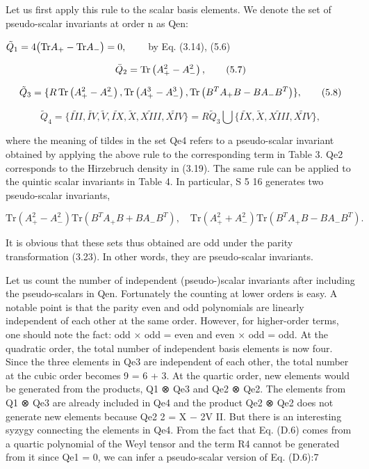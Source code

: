 \documentclass{article}
\begin{document}
Let us first apply this rule to the scalar basis elements. We denote the set of pseudo-scalar invariants at order n as Qen:

$\tilde{Q}_{1}=4\big{(}{\rm Tr}A_{+}-{\rm Tr}A_{-}\big{)}=0,\qquad$ by Eq. (3.14), (5.6)

$$\bar{Q}_{2}={\rm Tr}\left(A_{+}^{2}-A_{-}^{2}\right),\tag{5.7}$$

$$\tilde{Q}_{3}=\{R\,{\rm Tr}\left(A_{+}^{2}-A_{-}^{2}\right),{\rm Tr}\left(A_{+}^{3}-A_{-}^{3}\right),{\rm Tr}\left(B^{T}A_{+}B-BA_{-}B^{T}\right)\},\tag{5.8}$$

$$\widetilde{Q}_{4}=\{\widetilde{III},\widetilde{IV},\widetilde{V},\widetilde{IX},\widetilde{X},\widetilde{XIII},\widetilde{XIV}\}=R\widetilde{Q}_{3}\bigcup\{\widetilde{IX},\widetilde{X},\widetilde{XIII},\widetilde{XIV}\},\tag{5.9}$$

where the meaning of tildes in the set Qe4 refers to a pseudo-scalar invariant obtained by applying the above rule to the corresponding term in Table 3. Qe2 corresponds to the Hirzebruch density in (3.19). The same rule can be applied to the quintic scalar invariants in Table 4. In particular, S 5 16 generates two pseudo-scalar invariants,

$$\mathrm{Tr}\left(A_{+}^{2}-A_{-}^{2}\right)\mathrm{Tr}\left(B^{T}A_{+}B+B A_{-}B^{T}\right),\quad\mathrm{Tr}\left(A_{+}^{2}+A_{-}^{2}\right)\mathrm{Tr}\left(B^{T}A_{+}B-B A_{-}B^{T}\right).$$

It is obvious that these sets thus obtained are odd under the parity transformation (3.23). In other words, they are pseudo-scalar invariants.

Let us count the number of independent (pseudo-)scalar invariants after including the pseudo-scalars in Qen. Fortunately the counting at lower orders is easy. A notable point is that the parity even and odd polynomials are linearly independent of each other at the same order. However, for higher-order terms, one should note the fact: odd × odd = even and even × odd = odd. At the quadratic order, the total number of independent basis elements is now four. Since the three elements in Qe3 are independent of each other, the total number at the cubic order becomes 9 = 6 + 3. At the quartic order, new elements would be generated from the products, Q1 ⊗ Qe3 and Qe2 ⊗ Qe2. The elements from Q1 ⊗ Qe3 are already included in Qe4 and the product Qe2 ⊗ Qe2 does not generate new elements because Qe2 2 = X − 2V II. But there is an interesting syzygy connecting the elements in Qe4. From the fact that Eq. (D.6) comes from a quartic polynomial of the Weyl tensor and the term R4 cannot be generated from it since Qe1 = 0, we can infer a pseudo-scalar version of Eq. (D.6):7
\end{document}
